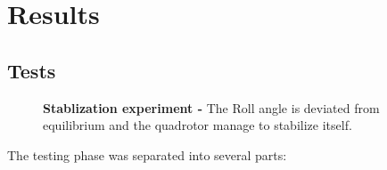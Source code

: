 \documentclass[conference]{IEEEtran}
\begin{document}
\section{Results}

\subsection{Tests}
\label{sec:results-tests}


\begin{figure}[h!]
  \centering
   \hspace*{-5pt}
  \caption{\textbf{Stablization experiment -} The Roll angle is deviated from equilibrium and the quadrotor manage to stabilize itself.}
  \label{fig:rotaciones}
\end{figure}


The testing phase was separated into several parts:
\end{document}
